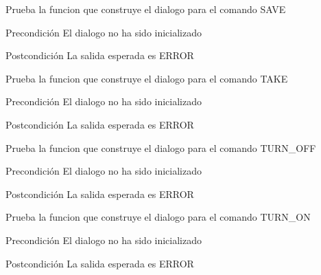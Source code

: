 \begin{DoxyRefList}
\item[\label{test__test000035}%
\hypertarget{test__test000035}{}%
Global \hyperlink{dialogue__test_8c_a16cae248773d935d46b61a10b1d5de30}{test2\-\_\-dialogue\-\_\-save} ()]Prueba la funcion que construye el dialogo para el comando S\-A\-V\-E \begin{DoxyPrecond}{Precondición}
El dialogo no ha sido inicializado 
\end{DoxyPrecond}
\begin{DoxyPostcond}{Postcondición}
La salida esperada es E\-R\-R\-O\-R  
\end{DoxyPostcond}

\item[\label{test__test000031}%
\hypertarget{test__test000031}{}%
Global \hyperlink{dialogue__test_8c_a6e20c2c89fc1fe8f08c205c4a568e8ff}{test2\-\_\-dialogue\-\_\-take} ()]Prueba la funcion que construye el dialogo para el comando T\-A\-K\-E \begin{DoxyPrecond}{Precondición}
El dialogo no ha sido inicializado 
\end{DoxyPrecond}
\begin{DoxyPostcond}{Postcondición}
La salida esperada es E\-R\-R\-O\-R  
\end{DoxyPostcond}

\item[\label{test__test000047}%
\hypertarget{test__test000047}{}%
Global \hyperlink{dialogue__test_8c_a2ce6fa8ed572d92e5099c31ef438ae5c}{test2\-\_\-dialogue\-\_\-turn\-\_\-off} ()]Prueba la funcion que construye el dialogo para el comando T\-U\-R\-N\-\_\-\-O\-F\-F \begin{DoxyPrecond}{Precondición}
El dialogo no ha sido inicializado 
\end{DoxyPrecond}
\begin{DoxyPostcond}{Postcondición}
La salida esperada es E\-R\-R\-O\-R  
\end{DoxyPostcond}

\item[\label{test__test000045}%
\hypertarget{test__test000045}{}%
Global \hyperlink{dialogue__test_8c_a74f7e26397bc15bf0d776dacffbfb205}{test2\-\_\-dialogue\-\_\-turn\-\_\-on} ()]Prueba la funcion que construye el dialogo para el comando T\-U\-R\-N\-\_\-\-O\-N \begin{DoxyPrecond}{Precondición}
El dialogo no ha sido inicializado 
\end{DoxyPrecond}
\begin{DoxyPostcond}{Postcondición}
La salida esperada es E\-R\-R\-O\-R  
\end{DoxyPostcond}


\end{DoxyRefList}

